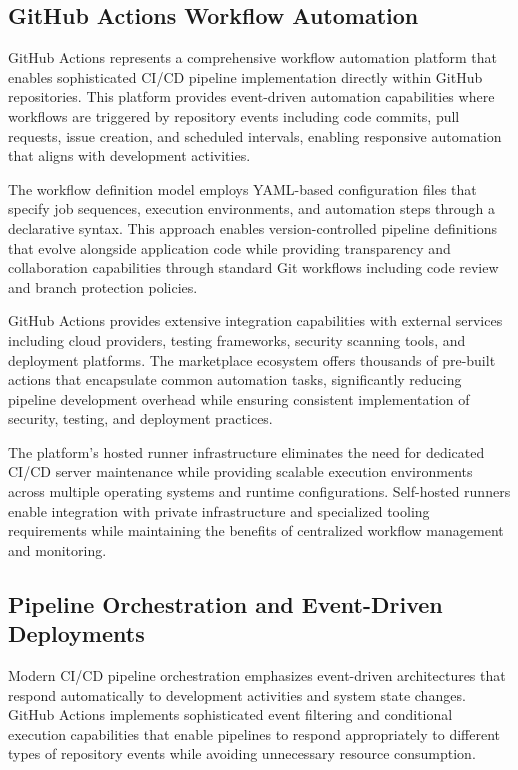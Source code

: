 \subsection{GitHub Actions Workflow Automation}

GitHub Actions represents a comprehensive workflow automation platform that enables sophisticated CI/CD pipeline implementation directly within GitHub repositories. This platform provides event-driven automation capabilities where workflows are triggered by repository events including code commits, pull requests, issue creation, and scheduled intervals, enabling responsive automation that aligns with development activities.

The workflow definition model employs YAML-based configuration files that specify job sequences, execution environments, and automation steps through a declarative syntax. This approach enables version-controlled pipeline definitions that evolve alongside application code while providing transparency and collaboration capabilities through standard Git workflows including code review and branch protection policies.

GitHub Actions provides extensive integration capabilities with external services including cloud providers, testing frameworks, security scanning tools, and deployment platforms. The marketplace ecosystem offers thousands of pre-built actions that encapsulate common automation tasks, significantly reducing pipeline development overhead while ensuring consistent implementation of security, testing, and deployment practices.

The platform's hosted runner infrastructure eliminates the need for dedicated CI/CD server maintenance while providing scalable execution environments across multiple operating systems and runtime configurations. Self-hosted runners enable integration with private infrastructure and specialized tooling requirements while maintaining the benefits of centralized workflow management and monitoring.

\subsection{Pipeline Orchestration and Event-Driven Deployments}

Modern CI/CD pipeline orchestration emphasizes event-driven architectures that respond automatically to development activities and system state changes. GitHub Actions implements sophisticated event filtering and conditional execution capabilities that enable pipelines to respond appropriately to different types of repository events while avoiding unnecessary resource consumption.

